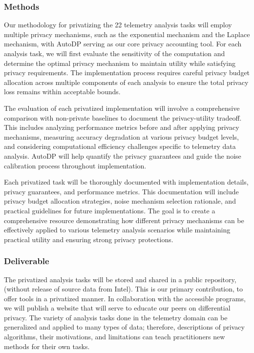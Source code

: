 \documentclass[12pt,letterpaper]{article}
\begin{document}
\begin{table}[h]
\subsubsection{Methods}

Our methodology for privatizing the 22 telemetry analysis tasks will employ multiple privacy mechanisms, such as the exponential mechanism and the Laplace mechanism, with AutoDP serving as our core privacy accounting tool. For each analysis task, we will first evaluate the sensitivity of the computation and determine the optimal privacy mechanism to maintain utility while satisfying privacy requirements. The implementation process requires careful privacy budget allocation across multiple components of each analysis to ensure the total privacy loss remains within acceptable bounds.

The evaluation of each privatized implementation will involve a comprehensive comparison with non-private baselines to document the privacy-utility tradeoff. This includes analyzing performance metrics before and after applying privacy mechanisms, measuring accuracy degradation at various privacy budget levels, and considering computational efficiency challenges specific to telemetry data analysis. AutoDP will help quantify the privacy guarantees and guide the noise calibration process throughout implementation. 

Each privatized task will be thoroughly documented with implementation details, privacy guarantees, and performance metrics. This documentation will include privacy budget allocation strategies, noise mechanism selection rationale, and practical guidelines for future implementations. The goal is to create a comprehensive resource demonstrating how different privacy mechanisms can be effectively applied to various telemetry analysis scenarios while maintaining practical utility and ensuring strong privacy protections.


\subsubsection{Deliverable}

The privatized analysis tasks will be stored and shared in a public repository, (without release of source data from Intel). This is our primary contribution, to offer tools in a privatized manner. In collaboration with the accessible programs, we will publish a website that will serve to educate our peers on differential privacy. The variety of analysis tasks done in the telemetry domain can be generalized and applied to many types of data; therefore, descriptions of privacy algorithms, their motivations, and limitations can teach practitioners new methods for their own tasks. 


\end{table}
\end{document}
